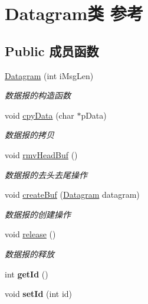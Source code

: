 \hypertarget{class_datagram}{}\section{Datagram类 参考}
\label{class_datagram}
\subsection*{Public 成员函数}
\begin{DoxyCompactItemize}
\item 
\hyperlink{class_datagram_a4f1b9ef3e5a00a11e9b206665c5968dd}{Datagram} (int i\+Msg\+Len)
\begin{DoxyCompactList}\small\item\em 数据报的构造函数 \end{DoxyCompactList}\item 
void \hyperlink{class_datagram_afd6c80ab2f1f89bf6883bc552777668f}{cpy\+Data} (char $\ast$p\+Data)
\begin{DoxyCompactList}\small\item\em 数据报的拷贝 \end{DoxyCompactList}\item 
void \hyperlink{class_datagram_a92f5c858fa5f872bc7576346b932f77a}{rmv\+Head\+Buf} ()
\begin{DoxyCompactList}\small\item\em 数据报的去头去尾操作 \end{DoxyCompactList}\item 
void \hyperlink{class_datagram_ad54ae1c5f2522a9d6ab2145bfa33e7e4}{create\+Buf} (\hyperlink{class_datagram}{Datagram} datagram)
\begin{DoxyCompactList}\small\item\em 数据报的创建操作 \end{DoxyCompactList}\item 
\mbox{\label{class_datagram_ab3912f9748416eac75309fae598017c8}} 
void \hyperlink{class_datagram_ab3912f9748416eac75309fae598017c8}{release} ()
\begin{DoxyCompactList}\small\item\em 数据报的释放 \end{DoxyCompactList}\item 
\mbox{\label{class_datagram_aac2187f8896acdd5dc5424b8934d454a}} 
int {\bfseries get\+Id} ()
\item 
\mbox{\label{class_datagram_a396a4dba1b8d973ce0d8951ca885872c}} 
void {\bfseries set\+Id} (int id)
\end{DoxyCompactItemize}
